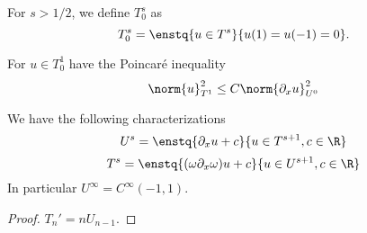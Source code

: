 \documentclass[]{article}
\begin{document}
\begin{Def} For $s > 1/2$, we define $T^s_0$ as 
	\[T^s_0 = \enstq{u \in T^s}{u(1) = u(-1) = 0}.\]
\end{Def}
\begin{Prop}
	For $u \in T^1_0$ have the Poincaré inequality 
	\[\norm{u}_{T^1}^2 \leq C \norm{\partial_x u}_{U^0}^2\]
\end{Prop}
\begin{Prop}
	We have the following characterizations
	\[U^s = \enstq{\partial_x u + c}{ u \in T^{s+1}, c \in \R}\]
	\[T^s= \enstq{(\omega \partial_x \omega) u + c}{u \in U^{s+1}, c \in \R}\]
	In particular $U^{\infty} = C^{\infty}(-1,1)$.  
	\begin{proof}
		$T_n' = nU_{n-1}$.

	\end{proof}
\end{Prop}
\end{document}
